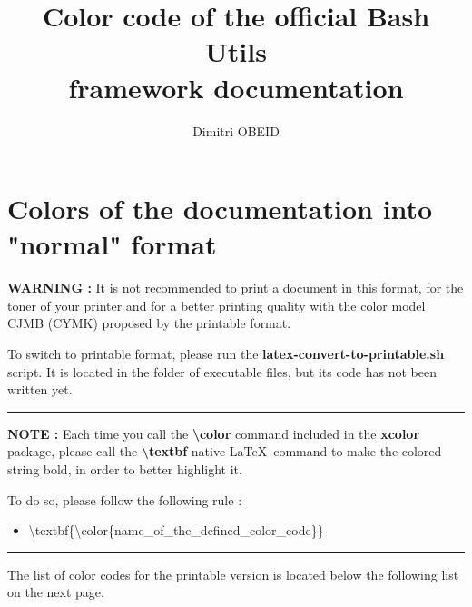 \documentclass[a4paper,10pt]{article}
\title{\color{sec1}Color code of the official Bash Utils \\framework documentation}\color{text}
\author{Dimitri OBEID}
\begin{document}
\maketitle

\color{sec1}
\section{Colors of the documentation into "normal" format}\color{text}

\begin{justify}
  \textbf{\color{case}WARNING :} It is not recommended to print a document in this format, for the toner of your printer and for a better printing quality with the color model CJMB (CYMK) proposed by the printable format.

  To switch to printable format, please run the \textbf{\color{cmds}latex-convert-to-printable.sh} script. It is located in the folder of executable files, but its code has not been written yet.
\end{justify}

\color{text}\par\noindent\rule{\textwidth}{0.4pt}\color{text}

\begin{justify}
  \textbf{NOTE :} Each time you call the \textbf{\textbackslash{color}} command included in the \textbf{xcolor} package, please call the \textbf{\textbackslash{textbf}} native \LaTeX \ command to make the colored string bold, in order to better highlight it.
\end{justify}

\begin{justify}
  To do so, please follow the following rule :

  \begin{itemize}
    \item \textbackslash{textbf\{\textbackslash{color\{name\_of\_the\_defined\_color\_code}\}}\}
  \end{itemize}
\end{justify}

\color{text}\par\noindent\rule{\textwidth}{0.4pt}\color{text}

\begin{justify}
  The list of color codes for the printable version is located below the following list on the next page.
\end{justify}
\end{document}
